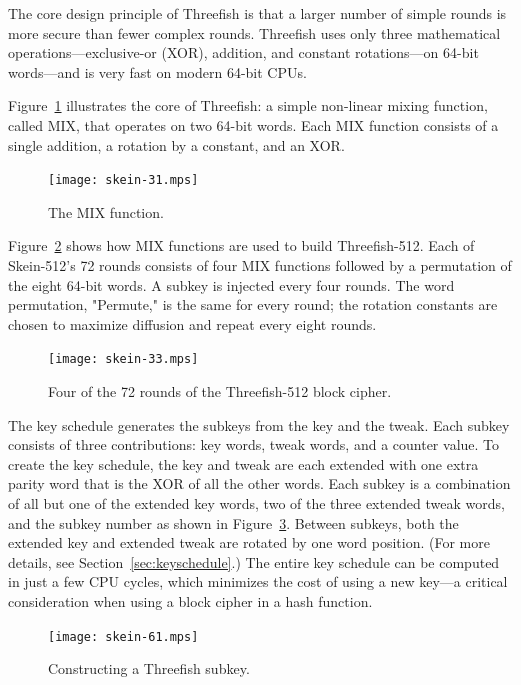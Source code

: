 \documentclass[11pt,twoside]{article}
\begin{document}
The core design principle of Threefish is that a larger number of simple rounds is more secure than fewer complex rounds.  Threefish uses only three mathematical operations---exclusive-or (XOR), addition, and constant rotations---on 64-bit words---and is very fast on modern 64-bit CPUs.

Figure~\ref{fig:mixingfunction} illustrates the core of Threefish: a simple non-linear mixing function, called MIX, that operates on two 64-bit words.  Each MIX function consists of a single addition, a rotation by a constant, and an XOR.
%
\begin{figure}[htbp]
\begin{center}
\texttt{[image: skein-31.mps]}
\end{center}
\caption{The MIX function.} \label{fig:mixingfunction}
\end{figure}

Figure~\ref{fig:Threefish512} shows how MIX functions are used to build Threefish-512.  Each of Skein-512's 72 rounds consists of four MIX functions followed by a permutation of the eight 64-bit words.  A subkey is injected every four rounds.  The word permutation, "Permute," is the same for every round; the rotation constants are chosen to maximize diffusion and repeat every eight rounds.
%
\begin{figure}[htbp]
\begin{center}
\texttt{[image: skein-33.mps]}
\end{center}
\caption{Four of the 72 rounds of the Threefish-512 block cipher.} \label{fig:Threefish512}
\end{figure}

The key schedule generates the subkeys from the key and the tweak.  Each subkey consists of three contributions: key words, tweak words, and a counter value.  To create the key schedule, the key and tweak are each extended with one extra parity word that is the XOR of all the other words.  Each subkey is a combination of all but one of the extended key words, two of the three extended tweak words, and the subkey number as shown in Figure~\ref{fig:ThreefishSubkey}.  Between subkeys, both the extended key and extended tweak are rotated by one word position. (For more details, see Section~\ref{sec:keyschedule}.)  The entire key schedule can be computed in just a few CPU cycles, which minimizes the cost of using a new key---a critical consideration when using a block cipher in a hash function.
%
\begin{figure}[htbp]
\begin{center}
\texttt{[image: skein-61.mps]}
\end{center}
\caption{Constructing a Threefish subkey.} \label{fig:ThreefishSubkey}
\end{figure}
\end{document}

